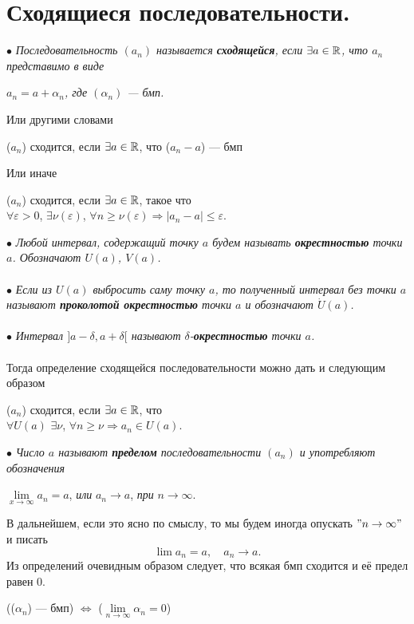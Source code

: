 \section{Сходящиеся последовательности.}
$\bullet$ \textit{Последовательность $(a_n)$ называется \textbf{сходящейся}, если $\exists a \in \mathbb{R}$, что $a_n$ представимо в виде} \begin{center}
	\textit{$a_n=a+\alpha_n$, где $(\alpha_n)$ --- бмп.}
\end{center} 
Или другими словами
\begin{center}
	($a_n$) сходится, если $\exists a \in \mathbb{R}$, что ($a_n-a$) --- бмп
\end{center}
Или иначе \begin{center}
	($a_n$) сходится, если  $\exists a \in \mathbb{R}$, такое что\\
	$\forall\varepsilon > 0$, $\exists\nu{(\varepsilon)}$, $\forall n \geqslant\nu{(\varepsilon)}\Rightarrow|a_n-a|\leqslant\varepsilon$.
\end{center}
$\bullet$ \textit{Любой интервал, содержащий точку $a$ будем называть \textbf{окрестностью} точки $a$.
	Обозначают $U(a)$, $V(a)$.}\\\\
$\bullet$ \textit{Если из $U(a)$ выбросить саму точку $a$, то полученный интервал без точки $a$ называют \textbf{проколотой окрестностью} точки $a$ и обозначают $\dot U(a)$.}\\\\
$\bullet$ \textit{Интервал $]a-\delta,a+\delta[$ называют $\delta$-\textbf{окрестностью} точки $a$.}\\\\
Тогда определение сходящейся последовательности можно дать и следующим образом
\begin{center}
	($a_n$) сходится, если $\exists a \in \mathbb{R}$, что\\
	$\forall U(a)$  $\exists\nu$, $\forall n \geqslant\nu \Rightarrow a_n \in U(a).$\\
\end{center}
$\bullet$ \textit{Число $a$ называют \textbf{пределом} последовательности $(a_n)$ и употребляют обозначения}\begin{center}
	$\lim\limits_{x\to \infty}a_n=a$, \textit{или} $a_n\to a$, \textit{при} $ n\to \infty.$
\end{center}
В дальнейшем, если это ясно по смыслу, то мы будем иногда опускать $"n\to\infty"$ и писать $$\lim a_n=a,\quad a_n\to a.$$
Из определений очевидным образом следует, что всякая бмп сходится и её предел равен 0.\begin{center}
	(($\alpha_n$) --- бмп) $\Longleftrightarrow$ ($\lim\limits_{n\to \infty}\alpha_n=0$)
\end{center}
